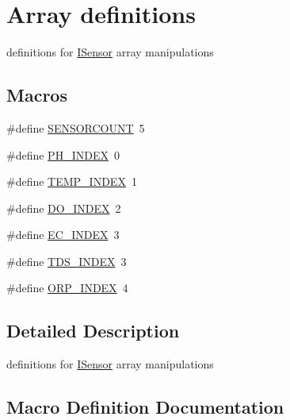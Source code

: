 \hypertarget{group___a_r_r_a_y___d_e_f_s}{}\section{Array definitions}
\label{group___a_r_r_a_y___d_e_f_s}


definitions for \hyperlink{class_i_sensor}{I\+Sensor} array manipulations  


\subsection*{Macros}
\begin{DoxyCompactItemize}
\item 
\#define \hyperlink{group___a_r_r_a_y___d_e_f_s_ga462faefe5424328c9f713503ecafeb6f}{S\+E\+N\+S\+O\+R\+C\+O\+U\+NT}~5
\item 
\#define \hyperlink{group___a_r_r_a_y___d_e_f_s_gaad8cbdb71736e79d15b2699c50b5dbfd}{P\+H\+\_\+\+I\+N\+D\+EX}~0
\item 
\#define \hyperlink{group___a_r_r_a_y___d_e_f_s_ga87282d20e6a935e76f14d903959695b5}{T\+E\+M\+P\+\_\+\+I\+N\+D\+EX}~1
\item 
\#define \hyperlink{group___a_r_r_a_y___d_e_f_s_gae984a0da3b36fc26bc8c5c79ac1fc1fa}{D\+O\+\_\+\+I\+N\+D\+EX}~2
\item 
\#define \hyperlink{group___a_r_r_a_y___d_e_f_s_ga01f1891f3723e0d0f6466d0afadf8e16}{E\+C\+\_\+\+I\+N\+D\+EX}~3
\item 
\#define \hyperlink{group___a_r_r_a_y___d_e_f_s_ga855d2056682afca7f6fab69afcc65b6a}{T\+D\+S\+\_\+\+I\+N\+D\+EX}~3
\item 
\#define \hyperlink{group___a_r_r_a_y___d_e_f_s_ga7104f69c9df0ea675fddbf7cf1b4ec22}{O\+R\+P\+\_\+\+I\+N\+D\+EX}~4
\end{DoxyCompactItemize}


\subsection{Detailed Description}
definitions for \hyperlink{class_i_sensor}{I\+Sensor} array manipulations 



\subsection{Macro Definition Documentation}

